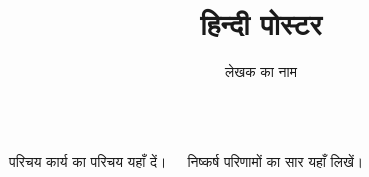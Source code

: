 \documentclass{beamer}
\title{हिन्दी पोस्टर}
\author{लेखक का नाम}
\begin{document}
\begin{frame}
\begin{columns}[t]
  \begin{block}{परिचय}
    कार्य का परिचय यहाँ दें।
  \end{block}
  \begin{block}{निष्कर्ष}
    परिणामों का सार यहाँ लिखें।
  \end{block}
\end{columns}
\end{frame}
\end{document}
